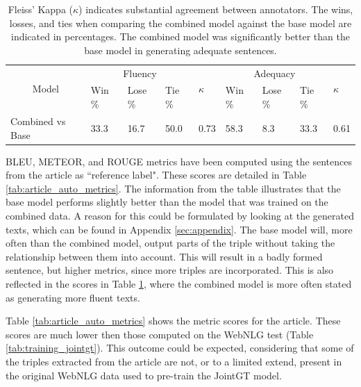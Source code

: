 \documentclass[
hf, %
]{ceurart}
\begin{document}
\begin{table}[ht]
\centering
\begin{tabular}{|c|lll|l|lll|l|}
\hline
\multirow{2}{*}{Model}                 & \multicolumn{3}{c|}{Fluency}                                        & \multirow{2}{*}{$\kappa$} & \multicolumn{3}{c|}{Adequacy}                                       & \multirow{2}{*}{$\kappa$} \\ \cline{2-4} \cline{6-8}
                                       & \multicolumn{1}{l|}{Win \%} & \multicolumn{1}{l|}{Lose \%} & Tie \% &                    & \multicolumn{1}{l|}{Win \%} & \multicolumn{1}{l|}{Lose \%} & Tie \% &                    \\ \hline
\multicolumn{1}{|l|}{Combined vs Base} & \multicolumn{1}{l|}{33.3}   & \multicolumn{1}{l|}{16.7}    & 50.0   & 0.73               & \multicolumn{1}{l|}{58.3}   & \multicolumn{1}{l|}{8.3}     & 33.3   & 0.61               \\ \hline
\end{tabular}
\caption{Fleiss' Kappa ($\kappa$) indicates substantial agreement between annotators. The wins, losses, and ties when comparing the combined model against the base model are indicated in percentages. The combined model was significantly better than the base model in generating adequate sentences.}
\label{tab:article_annotations}
\end{table}

BLEU, METEOR, and ROUGE metrics have been computed using the sentences from the article as ``reference label". These scores are detailed in Table \ref{tab:article_auto_metrics}. The information from the table illustrates that the base model performs slightly better than the model that was trained on the combined data. A reason for this could be formulated by looking at the generated texts, which can be found in Appendix \ref{sec:appendix}. The base model will, more often than the combined model, output parts of the triple without taking the relationship between them into account. This will result in a badly formed sentence, but higher metrics, since more triples are incorporated. This is also reflected in the scores in Table \ref{tab:article_annotations}, where the combined model is more often stated as generating more fluent texts.

Table \ref{tab:article_auto_metrics} shows the metric scores for the article. These scores are much lower then those computed on the WebNLG test (Table \ref{tab:training_jointgt}). This outcome could be expected, considering that some of the triples extracted from the article are not, or to a limited extend, present in the original WebNLG data used to pre-train the JointGT model.
\end{document}
